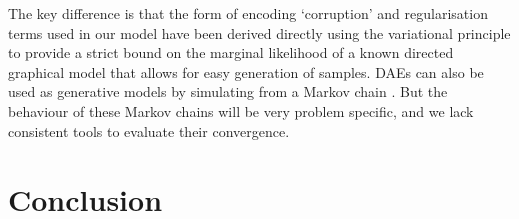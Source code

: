 \documentclass{article}
\begin{document}
\begin{bibunit}[icml2013]
The key difference is that the 
form of encoding `corruption' and regularisation terms used in our model 
have been derived directly using the variational principle to provide a strict 
bound on the marginal likelihood of a known directed graphical model 
that allows for easy generation of samples. 
DAEs can also be used as generative models by simulating from a Markov chain \citep{bengio2013,bengio2013deep}.
But the behaviour of these Markov chains will be very problem specific, 
and we lack consistent tools to evaluate their convergence. 





\vspace{-3mm}
\section{Conclusion}
\label{sec:Discussion}


\end{bibunit}
\end{document}
